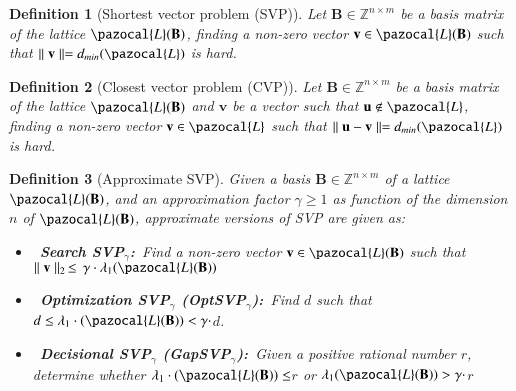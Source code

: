 \documentclass[10pt]{elsarticle}
\newtheorem{definition}{Definition}
\begin{document}
\begin{definition}[Shortest vector problem (SVP)]
\normalfont Let $\mathbf{B}\in\mathbb{Z}^{n\times m}$ be a basis
matrix of the lattice $\pazocal{L}(\mathbf{B})$, finding a non-zero
vector $\mathbf{v}\in\pazocal{L}(\mathbf{B})$ such that $\parallel
\mathbf{v}\parallel = d_{min}(\pazocal{L})$ is hard.
\end{definition}

\begin{definition}[Closest vector problem (CVP)]
\normalfont Let $\mathbf{B}\in\mathbb{Z}^{n\times m}$ be a basis
matrix of the lattice $\pazocal{L}(\mathbf{B})$ and $\mathbf{v}$ be
a vector such that $\mathbf{u}\notin\pazocal{L}$, finding a non-zero
vector $\mathbf{v}\in\pazocal{L}$ such that
$\parallel\mathbf{u}-\mathbf{v}\parallel = d_{min}(\pazocal{L})$ is
hard.
\end{definition}



\begin{definition}[Approximate SVP]
\normalfont  Given a basis $\mathbf{B}\in\mathbb{Z}^{n\times m}$ of
a lattice $\pazocal{L}(\mathbf{B})$, and an approximation factor
$\gamma\geq1$ as function of the dimension $n$ of
$\pazocal{L}(\mathbf{B})$, approximate versions of SVP are given as:
\begin{itemize}
\item~\textbf{Search SVP$_{\gamma}$:}~Find a non-zero vector $\mathbf{v}\in\pazocal{L}(\mathbf{B})$ such that $\parallel \mathbf{v} \parallel _{2} \, \leq \, \gamma\cdot\lambda_{1}(\pazocal{L}(\mathbf{B}))$

\item~\textbf{Optimization SVP$_{\gamma}$ (OptSVP$_{\gamma}$):}~Find $d$ such that $d\leq\lambda_{1}\cdot(\pazocal{L}(\mathbf{B}))<\gamma\cdot$$d$.

\item~\textbf{Decisional SVP$_{\gamma}$ (GapSVP$_{\gamma}$):}~Given a positive rational number $r$, determine whether $\lambda_{1}\cdot(\pazocal{L}(\mathbf{B}))\leq$$r$ or $\lambda_{1}(\pazocal{L}(\mathbf{B}))> \gamma\cdot$$r$
\end{itemize}
\end{definition}
\end{document}
